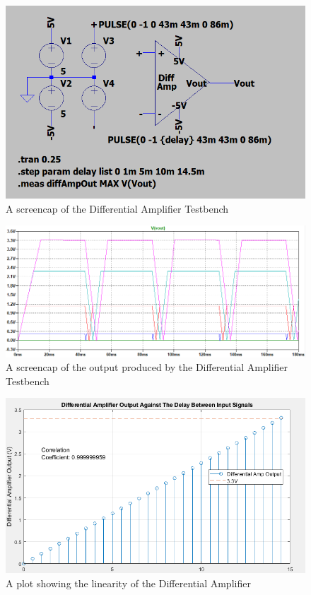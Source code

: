 \begin{figure}[H]
    \centering 
    \includegraphics[width=\textwidth]{../Circuits/Images/DifferentialAmp/TestBench}
    \caption{A screencap of the Differential Amplifier Testbench}
    \label{fig:differentialAmpTestBench}
\end{figure}

\begin{figure}[H]
    \centering 
    \includegraphics[width=\textwidth]{../Circuits/Images/DifferentialAmp/TestBenchWaveform}
    \caption{A screencap of the output produced by the Differential Amplifier Testbench}
    \label{fig:differentialAmpTestBenchWaveform}
\end{figure}

\begin{figure}[H]
    \centering 
    \includegraphics[width=\textwidth]{../Circuits/Images/DifferentialAmp/linearityPlot}
    \caption{A plot showing the linearity of the Differential Amplifier}
    \label{fig:differentialAmpLinearity}
\end{figure}

